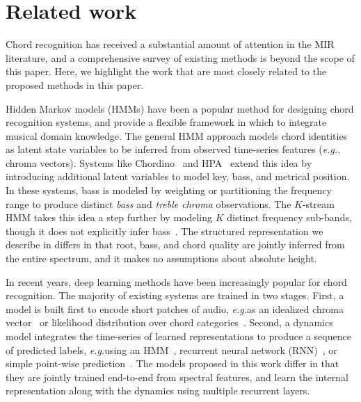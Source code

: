 \documentclass{article}
\def\eg{\emph{e.g.\/}}
\begin{document}
%
\section{Related work}

Chord recognition has received a substantial amount of attention in the MIR literature, and a comprehensive survey of existing methods is beyond the scope of this paper.
Here, we highlight the work that are most closely related to the proposed methods in this paper.

Hidden Markov models (HMMs) have been a popular method for designing chord recognition systems, and provide a flexible framework in which to integrate musical domain knowledge.
The general HMM approach models chord identities as latent state variables to be inferred from observed time-series features (\eg, chroma vectors).
Systems like Chordino~\cite{mauchsimple} and HPA~\cite{ni2012end} extend this idea by introducing additional latent variables to model key, bass, and metrical position.
In these systems, bass is modeled by weighting or partitioning the frequency range to produce distinct \emph{bass} and \emph{treble chroma} observations.
The $K$-stream HMM takes this idea a step further by modeling $K$ distinct frequency sub-bands, though it does not explicitly infer bass~\cite{cho2014improved}.
The structured representation we describe in  differs in that root, bass, and chord quality are jointly inferred from the entire spectrum, and it makes no assumptions about absolute height.



%   

In recent years, deep learning methods have been increasingly popular for chord recognition.
The majority of existing systems are trained in two stages. 
First, a model is built first to encode short patches of audio, \eg as an idealized chroma vector~\cite{boulanger2013audio,korzeniowski2016feature} or likelihood distribution over chord categories~\cite{humphrey2015four,sigtia2015audio,zhou2015chord,deng2016hybrid}.
Second, a dynamics model integrates the time-series of learned representations to produce a sequence of predicted labels, \eg using an HMM~\cite{humphrey2015four,zhou2015chord}, recurrent neural network (RNN)~\cite{boulanger2013audio,sigtia2015audio}, or simple point-wise prediction~\cite{korzeniowski2016feature}.
The models proposed in this work differ in that they are jointly trained end-to-end from spectral features, and learn the internal representation along with the dynamics using multiple recurrent layers.
\end{document}
